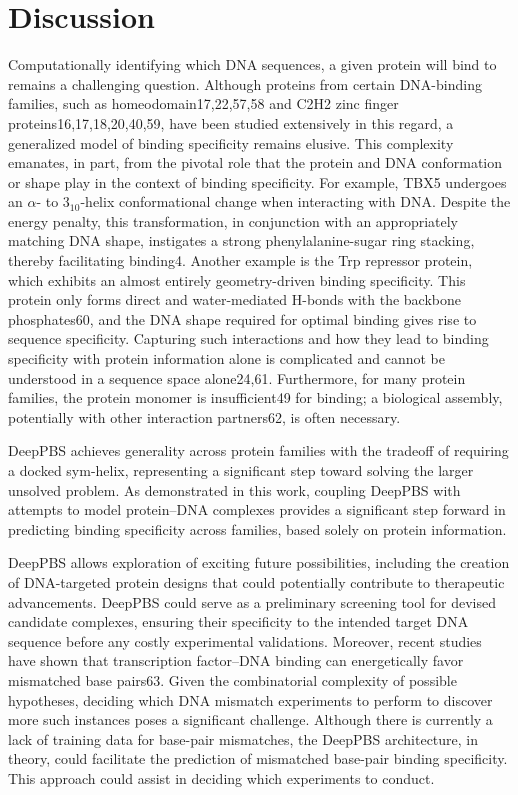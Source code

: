 \section{Discussion}

Computationally identifying which DNA sequences, a given protein will bind to remains a challenging question. Although proteins from certain DNA-binding families, such as homeodomain17,22,57,58 and C2H2 zinc finger proteins16,17,18,20,40,59, have been studied extensively in this regard, a generalized model of binding specificity remains elusive. This complexity emanates, in part, from the pivotal role that the protein and DNA conformation or shape play in the context of binding specificity. For example, TBX5 undergoes an $\alpha$- to $3_{10}$-helix conformational change when interacting with DNA. Despite the energy penalty, this transformation, in conjunction with an appropriately matching DNA shape, instigates a strong phenylalanine-sugar ring stacking, thereby facilitating binding4. Another example is the Trp repressor protein, which exhibits an almost entirely geometry-driven binding specificity. This protein only forms direct and water-mediated H-bonds with the backbone phosphates60, and the DNA shape required for optimal binding gives rise to sequence specificity. Capturing such interactions and how they lead to binding specificity with protein information alone is complicated and cannot be understood in a sequence space alone24,61. Furthermore, for many protein families, the protein monomer is insufficient49 for binding; a biological assembly, potentially with other interaction partners62, is often necessary.
\par
DeepPBS achieves generality across protein families with the tradeoff of requiring a docked sym-helix, representing a significant step toward solving the larger unsolved problem. As demonstrated in this work, coupling DeepPBS with attempts to model protein–DNA complexes provides a significant step forward in predicting binding specificity across families, based solely on protein information.
\par
DeepPBS allows exploration of exciting future possibilities, including the creation of DNA-targeted protein designs that could potentially contribute to therapeutic advancements. DeepPBS could serve as a preliminary screening tool for devised candidate complexes, ensuring their specificity to the intended target DNA sequence before any costly experimental validations. Moreover, recent studies have shown that transcription factor–DNA binding can energetically favor mismatched base pairs63. Given the combinatorial complexity of possible hypotheses, deciding which DNA mismatch experiments to perform to discover more such instances poses a significant challenge. Although there is currently a lack of training data for base-pair mismatches, the DeepPBS architecture, in theory, could facilitate the prediction of mismatched base-pair binding specificity. This approach could assist in deciding which experiments to conduct.
